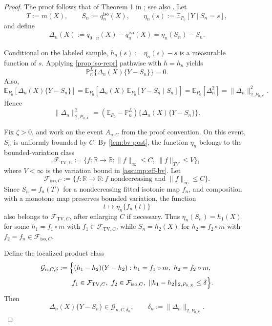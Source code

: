 \documentclass{article}
\theoremstyle{plain}
\theoremstyle{definition}
\newcommand{\E}{\mathbb{E}}
\newcommand{\R}{\mathbb{R}}
\newcommand{\1}{\mathbf{1}}
\newcommand{\mhat}{m}
\newcommand{\Pl}{\mathbb{P}^{L}_n}
\newcommand{\Px}{P_{0,X}}
\begin{document}
\begin{proof}
The proof follows that of Theorem 1 in \cite{van2023causal}; see also \cite{van2025venn}. Let
\[
T:=\mhat(X),\qquad S_n:=q_n^{\mathrm{iso}}(X),\qquad \eta_n(s):=\E_{P_0}[Y\mid S_n=s],
\]
and define
\[
\Delta_n(X):=q_{0\mid n}(X)-q_n^{\mathrm{iso}}(X)=\eta_n(S_n)-S_n.
\]

Conditional on the labeled sample, \(h_n(s):=\eta_n(s)-s\) is a measurable function of \(s\). Applying \cref{prop:iso-repr} pathwise with \(h=h_n\) yields
\[
\Pl\{\Delta_n(X)\{Y-S_n\}\}=0.
\]
Also,
\[
\E_{P_0}[\Delta_n(X)\{Y-S_n\}]
=
\E_{P_0}[\Delta_n(X)\,\E_{P_0}[Y-S_n\mid S_n]]
=
\E_{P_0}[\Delta_n^2]
=
\|\Delta_n\|_{2,\Px}^2.
\]
Hence
\[
\|\Delta_n\|_{2,\Px}^2
=
(\E_{P_0}-\Pl)\{\Delta_n(X)\{Y-S_n\}\}.
\]

Fix \(\zeta>0\), and work on the event \(A_{n,C}\) from the proof convention. On this event, \(S_n\) is uniformly bounded by \(C\). By \cref{lem:bv-post}, the function \(\eta_n\) belongs to the bounded-variation class
\[
\mathcal F_{\mathrm{TV},C}
:=
\{f:\R\to\R:\|f\|_\infty\le C,\ \|f\|_{TV}\le V\},
\]
where \(V<\infty\) is the variation bound in \cref{assump:eff-bv}. Let
\[
\mathcal F_{\mathrm{iso},C}
:=
\{f:\R\to\R:\text{$f$ nondecreasing and }\|f\|_\infty\le C\}.
\]
Since \(S_n=f_n(T)\) for a nondecreasing fitted isotonic map \(f_n\), and composition with a monotone map preserves bounded variation, the function
\[
t\mapsto \eta_n\{f_n(t)\}
\]
also belongs to \(\mathcal F_{\mathrm{TV},C}\), after enlarging \(C\) if necessary. Thus \(\eta_n(S_n)=h_1(X)\) for some \(h_1=f_1\circ\mhat\) with \(f_1\in\mathcal F_{\mathrm{TV},C}\), while \(S_n=h_2(X)\) for \(h_2=f_2\circ\mhat\) with \(f_2=f_n\in\mathcal F_{\mathrm{iso},C}\).

Define the localized product class
\[\begin{aligned}
\mathcal G_{n,C,\delta}
&:=
\Bigl\{
(h_1-h_2)(Y-h_2):
h_1=f_1\circ\mhat,\ h_2=f_2\circ\mhat,\\
&\qquad f_1\in\mathcal F_{\mathrm{TV},C},\
f_2\in\mathcal F_{\mathrm{iso},C},\
\|h_1-h_2\|_{2,\Px}\le \delta
\Bigr\}.
\end{aligned}\]
Then
\[
\Delta_n(X)\{Y-S_n\}\in\mathcal G_{n,C,\delta_n},
\qquad
\delta_n:=\|\Delta_n\|_{2,\Px}.
\]


\end{proof}
\end{document}
